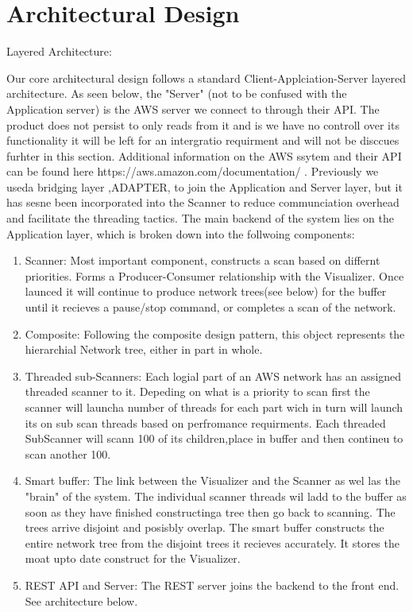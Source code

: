 \documentclass[hidelinks,a4paper,12pt]{article}
\begin{document}
\section{Architectural Design}
Layered Architecture: 

Our core architectural design follows a standard Client-Applciation-Server layered architecture. As seen below, the "Server" (not to be confused with the Application server) is the AWS server we connect to through their API. The product does not persist to only reads from it and is we have no controll over its functionality it will be left for an intergratio requirment and will not be disccues furhter in this section. Additional information on the AWS ssytem and their API can be found here https://aws.amazon.com/documentation/ . Previously we useda  bridging layer ,ADAPTER, to join the Application and Server layer, but  it has sesne been incorporated into the Scanner to reduce communciation overhead and facilitate the threading tactics. The main backend of the system lies on the Application layer, which is broken down into the follwoing components:
\begin{enumerate}  
					\item Scanner: Most important component, constructs a scan based on differnt priorities. Forms a Producer-Consumer relationship with the Visualizer. Once launced it will continue to produce network trees(see below) for the buffer until it recieves a pause/stop command, or completes a scan of the network. 
					\item Composite:  Following the composite design pattern, this object represents the hierarchial Network tree, either in part in whole.  
					\item Threaded sub-Scanners: Each logial part of an AWS network has an assigned threaded scanner to it. Depeding on what is a priority to scan first the scanner will launcha number of threads for each part wich in turn will launch its on sub scan threads based on perfromance requirments. Each threaded SubScanner will scann 100 of its children,place in buffer and then contineu to scan another 100. 
					\item Smart buffer: The link between the Visualizer and the Scanner as wel las the "brain" of the system. The individual scanner threads wil ladd to the buffer as soon as they have finished constructinga tree then go back to scanning. The trees arrive disjoint and posisbly overlap. The smart buffer constructs the entire network tree from the disjoint trees it recieves accurately. It stores the moat upto date construct for the Visualizer.
				\item REST API and Server: The REST server joins the backend to the front end. See architecture below.
				\end{enumerate}
\end{document}
